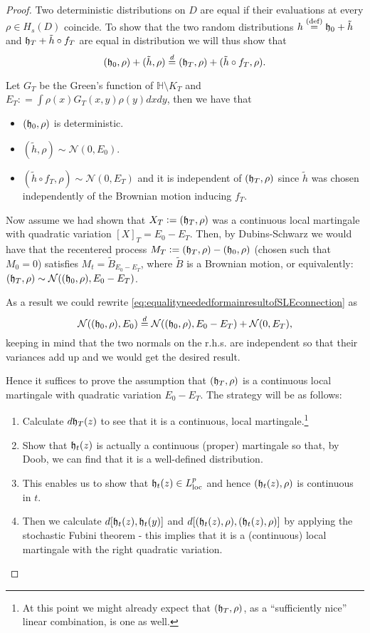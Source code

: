 \documentclass[11pt,reqno]{amsart}
\numberwithin{equation}{section}
\newcommand{\eqby}[1]{\mathrel{\stackrel{#1}{=}}}
\newcommand{\eqbydef}{\mathrel{\stackrel{\text{(def)}}{=}}}
\newcommand{\deq}{\mathrel{\mathop:}=}
\newcommand{\fh}{{\frak h}}
\begin{document}
\begin{proof}
	Two deterministic distributions on $D$ are equal if their evaluations at every $\rho\in H_s(D)$ coincide. To show that the two random distributions $h\eqbydef \fh_0+\tilde h$ and $\fh_T+\tilde h\circ f_T$ are equal in distribution we will thus show that \begin{equation}\label{eq:equalityneededformainresultofSLEconnection}
			(\fh_0,\rho)+(\tilde h,\rho)\eqby{d}(\fh_T,\rho)+(\tilde h\circ f_T,\rho).
		\end{equation}
	
	Let $G_T$ be the Green's function of $\mathbb H\setminus K_T$ and $E_T\deq\int \rho(x)G_T(x,y)\rho(y)dxdy$, then we have that
	\begin{itemize}
		\item $(\fh_0,\rho)$ is deterministic.
		\item $(\tilde h,\rho)\sim\mathcal N(0,E_0)$.
		\item $(\tilde h\circ f_T,\rho)\sim\mathcal N(0,E_T)$ and it is independent of $(\fh_T,\rho)$ since $\tilde h$ was chosen independently of the Brownian motion inducing $f_T$.
	\end{itemize}
	Now assume we had shown that $X_T\deq(\fh_T,\rho)$ was a continuous local martingale with quadratic variation $[X]_T=E_0-E_T$. Then, by Dubins-Schwarz we would have that the recentered process $M_T\deq(\fh_T,\rho)-(\fh_0,\rho)$ (chosen such that $M_0=0$) satisfies $M_t=\tilde B_{E_0-E_T}$, where $\tilde B$ is a Brownian motion, or equivalently: $(\fh_T,\rho)\sim\mathcal N((\fh_0,\rho),E_0-E_T)$.
	
	As a result we could rewrite \eqref{eq:equalityneededformainresultofSLEconnection} as $$\mathcal N((\fh_0,\rho),E_0)\eqby{d}\mathcal N((\fh_0,\rho),E_0-E_T)+\mathcal N(0,E_T),$$
	keeping in mind that the two normals on the r.h.s. are independent so that their variances add up and we would get the desired result.
	
	Hence it suffices to prove the assumption that $(\fh_T,\rho)$ is a continuous local martingale with quadratic variation $E_0-E_T$. The strategy will be as follows:
	\begin{enumerate}
		\item Calculate $d\fh_T(z)$ to see that it is a continuous, local martingale.\footnote{At this point we might already expect that $(\fh_T,\rho)$, as a ``sufficiently nice'' linear combination, is one as well.}
		\item Show that $\fh_t(z)$ is actually a continuous (proper) martingale so that, by Doob, we can find that it is a well-defined distribution.
		\item This enables us to show that $\fh_t(z)\in L^p_\text{loc}$ and hence $(\fh_t(z),\rho)$ is continuous in $t$.
		\item Then we calculate $d[\fh_t(z),\fh_t(y)]$ and $d[(\fh_t(z),\rho),(\fh_t(z),\rho)]$ by applying the stochastic Fubini theorem - this implies that it is a (continuous) local martingale with the right quadratic variation.
	\end{enumerate}
	
\end{proof}
\end{document}

